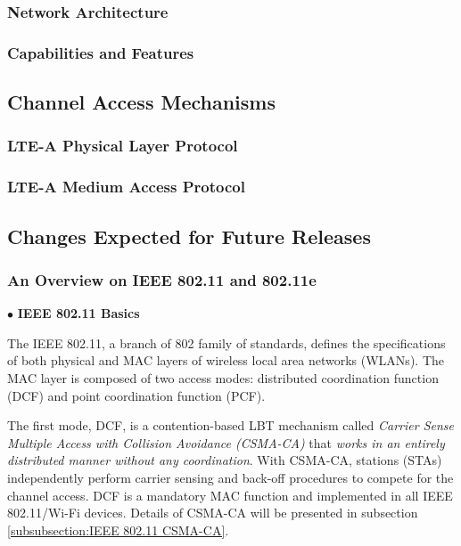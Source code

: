 \documentclass[12pt,onecolumn]{article}
\begin{document}
\subsubsection{Network Architecture}
\subsubsection{Capabilities and Features}
\subsection{Channel Access Mechanisms}
\subsubsection{LTE-A Physical Layer Protocol}
\subsubsection{LTE-A Medium Access Protocol}
\subsection{Changes Expected for Future Releases}
\subsubsection{An Overview on IEEE 802.11 and 802.11e}

\vspace{3mm}
\noindent $\bullet$ \textbf{IEEE 802.11 Basics}
\vspace{3mm}

\noindent The IEEE 802.11, a branch of 802 family of standards, defines the specifications of both physical and MAC layers of wireless local area networks (WLANs). The MAC layer is composed of two access modes: distributed coordination function (DCF) and point coordination function (PCF).

The first mode, DCF, is a contention-based LBT mechanism called \textit{Carrier Sense Multiple Access with Collision Avoidance (CSMA-CA)} that \textit{works in an entirely distributed manner without any coordination}. With CSMA-CA, stations (STAs) independently perform carrier sensing and back-off procedures to compete for the channel access. DCF is a mandatory MAC function and implemented in all IEEE 802.11/Wi-Fi devices. Details of CSMA-CA will be presented in subsection \ref{subsubsection:IEEE 802.11 CSMA-CA}.
\end{document}
